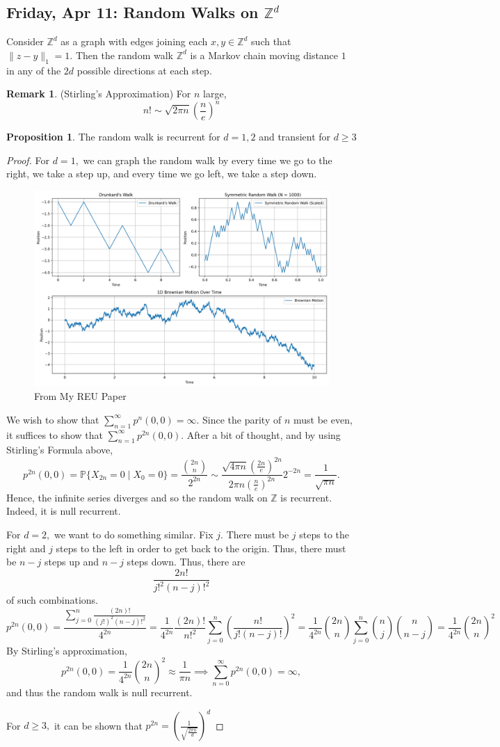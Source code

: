 \documentclass[10pt, oneside]{article}
\newcommand{\bbZ}{\mathbb{Z}}
\newcommand{\bbP}{\mathbb{P}}
\theoremstyle{definition}
\newtheorem{prop}{Proposition}
\newtheorem{rem}{Remark}
\begin{document}
\subsection*{Friday, Apr 11: Random Walks on $\bbZ^d$}
Consider $\bbZ^d$ as a graph with edges joining each $x,y \in \bbZ^d$ such that $\|z-y\|_1 = 1.$ Then the random walk $\bbZ^d$ is a Markov chain moving distance $1$ in any of the $2d$ possible directions at each step.
\begin{rem}
    (Stirling's Approximation) For $n$ large, 
    \[n! \sim \sqrt{2\pi n}(\frac{n}{e})^n\]
\end{rem}
\begin{prop}
    The random walk is recurrent for $d = 1,2$ and transient for $d\geq 3$
\end{prop}
\begin{proof}
    For $d = 1,$ we can graph the random walk by every time we go to the right, we take a step up, and every time we go left, we take a step down. 
\begin{figure}[H]
    \centering
    \includegraphics[width=0.5\linewidth]{Images/Drunkard's Walk.png}
    \caption{From My REU Paper}
\end{figure}
We wish to show that $\sum_{n=1}^\infty p^n(0,0) = \infty.$ Since the parity of $n$ must be even, it suffices to show that $\sum_{n=1}^\infty p^{2n}(0,0).$ After a bit of thought, and by using Stirling's Formula above,
\[p^{2n}(0,0) = \bbP\{X_{2n} = 0 \mid X_0 = 0\} = \frac{\binom{2n}{n}}{2^{2n}} \sim \frac{\sqrt{4\pi n}(\frac{2n}{e})^{2n}}{2\pi n (\frac{n}{e})^{2n}}2^{-2n} = \frac{1}{\sqrt{\pi n}}.\] Hence, the infinite series diverges and so the random walk on $\bbZ$ is recurrent. Indeed, it is null recurrent. 

For $d = 2,$ we want to do something similar. Fix $j.$ There must be $j$ steps to the right and $j$ steps to the left in order to get back to the origin. Thus, there must be $n-j$ steps up and $n-j$ steps down. Thus, there are 
\[\frac{2n!}{j!^2(n-j)!^2}\] of such combinations.
\[p^{2n}(0,0) = \frac{\sum_{j=0}^{n}\frac{(2n)!}{(j!)^2 (n-j)!^2}}{4^{2n}} = \frac{1}{4^{2n}}\frac{(2n)!}{n!^2}\sum_{j=0}^n \left(\frac{n!}{j! (n-j)!}\right)^2 = \frac{1}{4^{2n}}\binom{2n}{n}\sum_{j=0}^n \binom{n }{j}\binom{n}{n-j} = \frac{1}{4^{2n}} \binom{2n}{n}^2\] By Stirling's approximation,
\[p^{2n}(0,0)   = \frac{1}{4^{2n}} \binom{2n}{n}^2\approx \frac{1}{\pi n} \implies \sum_{n=0}^\infty p^{2n}(0,0) = \infty,\] and thus the random walk is null recurrent.


For $d\geq 3,$ it can be shown that $p^{2n} = \left(\frac{1}{\sqrt{\frac{2\pi n}{d}}}\right)^d$

\end{proof}
\end{document}
